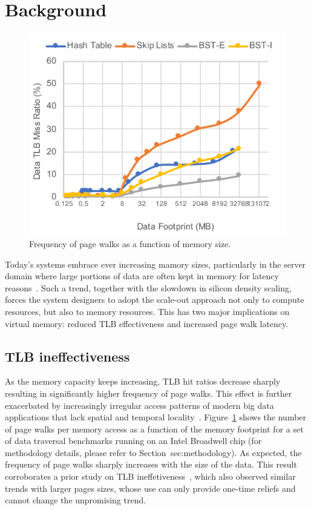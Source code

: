 \section{Background}
\label{sec:background}

\begin{figure}[t]
   \centering
   \includegraphics[width=1.0\columnwidth]{graphs/pagewalks.pdf}
   \caption{Frequency of page walks as a function of memory size.}
   \label{fig:pagewalks}
\end{figure}

Today's systems embrace ever increasing mamory sizes, particularly in the server domain where large portions of data are often kept in memory for latency reasons~\cite{}. Such a trend, together with the slowdown in silicon density scaling, forces the system designers to adopt the scale-out approach not only to compute resources, but also to memory resources. This has two major implications on virtual memory: reduced TLB effectiveness and increased page walk latency. 

\subsection{TLB ineffectiveness}
As the memory capacity keeps increasing, TLB hit ratios decrease sharply~\cite{} resulting in significantly higher frequency of page walks. This effect is further exacerbated by increasingly irregular access patterns of modern big data applications that lack spatial and temporal locality~\cite{}. Figure~\ref{fig:pagewalks} shows the number of page walks per memory access as a function of the memory footprint for a set of data traversal benchmarks running on an Intel Broadwell chip (for methodology details, please refer to Section~{sec:methodology}). As expected, the frequency of page walks sharply increases with the size of the data. This result corroborates a prior study on TLB ineffetiveness~\cite{}, which also observed similar trends with larger pages sizes, whose use can only provide one-time reliefs and cannot change the unpromising trend. 

